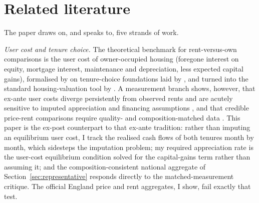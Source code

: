 
\section{Related literature}
\label{sec:literature}

The paper draws on, and speaks to, five strands of work.

\emph{User cost and tenure choice.} The theoretical benchmark for rent-versus-own comparisons is the user cost of owner-occupied housing (foregone interest on equity, mortgage interest, maintenance and depreciation, less expected capital gains), formalised by \textcite{poterba1984} on tenure-choice foundations laid by \textcite{henderson1983}, and turned into the standard housing-valuation tool by \textcite{himmelberg2005}. A measurement branch shows, however, that ex-ante user costs diverge persistently from observed rents and are acutely sensitive to imputed appreciation and financing assumptions \parencite{verbrugge2008,diaz2008}, and that credible price-rent comparisons require quality- and composition-matched data \parencite{hill2016,bracke2015}. This paper is the ex-post counterpart to that ex-ante tradition: rather than imputing an equilibrium user cost, I track the realised cash flows of both tenures month by month, which sidesteps the imputation problem; my required appreciation rate is the user-cost equilibrium condition solved for the capital-gains term rather than assuming it; and the composition-consistent national aggregate of Section~\ref{sec:representative} responds directly to the matched-measurement critique. The official England price and rent aggregates, I show, fail exactly that test.

